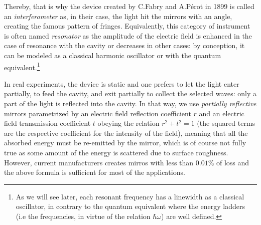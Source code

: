 \documentclass[11pt]{report}
\begin{document}
Thereby, that is why the device created by C.Fabry and A.Pérot in 1899 is called an \textit{interferometer} as, in their case, the light hit the mirrors with an angle, creating the famous pattern of fringes. Equivalently, this category of instrument is often named \textit{resonator} as the amplitude of the electric field is enhanced in the case of resonance with the cavity or decreases in other cases: by conception, it can be modeled as a classical harmonic oscillator or with the quantum equivalent.\footnote{As we will see later, each resonant frequency has a linewidth as a classical oscillator, in contrary to the quantum equivalent where the energy ladders (i.e the frequencies, in virtue of the relation $ \hbar \omega$) are well defined.}

In real experiments, the device is static and one prefers to let the light enter partially, to feed the cavity, and exit partially to collect the selected waves: only a part of the light is reflected into the cavity. In that way, we use \textit{partially reflective} mirrors parametrized by an electric field reflection coefficient $r$ and an electric field transmission coefficient $t$ obeying the relation $r^2 + t^2 = 1$ (the squared terms are the respective coefficient for the intensity of the field), meaning that all the absorbed energy must be re-emitted by the mirror, which is of course not fully true as some amount of the energy is scattered due to surface roughness. However, current manufacturers creates mirros with less than $0.01\%$ of loss and the above formula is sufficient for most of the applications.
\end{document}
